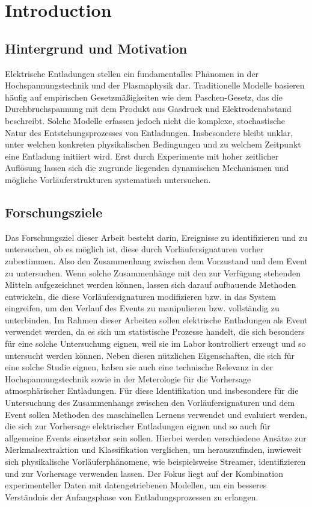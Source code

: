 \chapter{Introduction}
\label{chap:introduction}

\section{Hintergrund und Motivation}
\label{sec:background}

Elektrische Entladungen stellen ein fundamentalles Phänomen in der Hochspannungstechnik und der Plasmaphysik dar. Traditionelle Modelle basieren häufig auf empirischen Gesetzmäßigkeiten wie dem Paschen-Gesetz, das die Durchbruchspannung mit dem Produkt aus Gasdruck und Elektrodenabstand beschreibt. Solche Modelle erfassen jedoch nicht die komplexe, stochastische Natur des Entstehungsprozesses von Entladungen. Insbesondere bleibt unklar, unter welchen konkreten physikalischen Bedingungen und zu welchem Zeitpunkt eine Entladung initiiert wird. Erst durch Experimente mit hoher zeitlicher Auflösung lassen sich die zugrunde liegenden dynamischen Mechanismen und mögliche Vorläuferstrukturen systematisch untersuchen.

\section{Forschungsziele}
\label{sec:objectives}
Das Forschungsziel dieser Arbeit besteht darin, Ereignisse zu identifizieren und zu untersuchen, ob es möglich ist, diese durch Vorläufersignaturen vorher zubestimmen. Also den Zusammenhang zwischen dem Vorzustand und dem Event zu untersuchen. Wenn solche Zusammenhänge mit den zur Verfügung stehenden Mitteln aufgezeichnet werden können, lassen sich darauf aufbauende Methoden entwickeln, die diese Vorläufersignaturen modifizieren bzw. in das System eingreifen, um den Verlauf des Events zu manipulieren bzw. vollständig zu unterbinden. Im Rahmen dieser Arbeiten sollen elektrische Entladungen als Event verwendet werden, da es sich um statistische Prozesse handelt, die sich besonders für eine solche Untersuchung eignen, weil sie im Labor kontrolliert erzeugt und so untersucht werden können. Neben diesen nützlichen Eigenschaften, die sich für eine solche Studie eignen, haben sie auch eine technische Relevanz in der Hochspannungstechnik sowie in der Meterologie für die Vorhersage atmosphärischer Entladungen. Für diese Identifikation und insbesondere für die Untersuchung des Zusammenhangs zwischen den Vorläufersignaturen und dem Event sollen Methoden des maschinellen Lernens verwendet und evaluiert werden, die sich zur Vorhersage elektrischer Entladungen eignen und so auch für allgemeine Events einsetzbar sein sollen. Hierbei werden verschiedene Ansätze zur Merkmalsextraktion und Klassifikation verglichen, um herauszufinden, inwieweit sich physikalische Vorläuferphänomene, wie beispielsweise Streamer, identifizieren und zur Vorhersage verwenden lassen. Der Fokus liegt auf der Kombination experimenteller Daten mit datengetriebenen Modellen, um ein besseres Verständnis der Anfangsphase von Entladungsprozessen zu erlangen.

